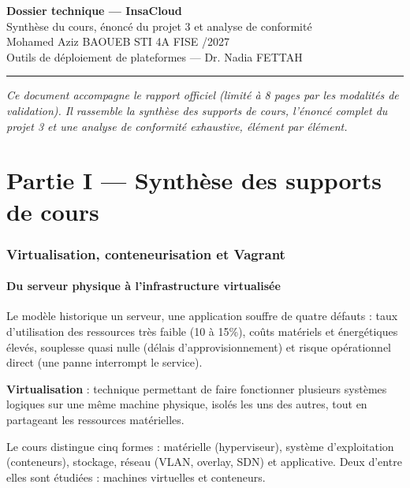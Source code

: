 \documentclass[11pt,a4paper]{article}
\begin{document}
\begin{center}
{\LARGE\bfseries Dossier technique --- InsaCloud}\\[3pt]
{\large Synthèse du cours, énoncé du projet 3 et analyse de conformité}\\[6pt]
{\small Mohamed Aziz BAOUEB \quad\textbullet\quad STI 4A FISE \quad\textbullet{}/2027\\
Outils de déploiement de plateformes --- Dr. Nadia FETTAH}
\end{center}
\rule{\linewidth}{0.8pt}

\small
\textit{Ce document accompagne le rapport officiel (limité à 8 pages par les modalités de validation).
Il rassemble la synthèse des supports de cours, l'énoncé complet du projet 3 et une analyse de
conformité exhaustive, élément par élément.}
\normalsize

\tableofcontents
\clearpage

\part*{Partie I --- Synthèse des supports de cours}

\section{Virtualisation, conteneurisation et Vagrant}

\subsection{Du serveur physique à l'infrastructure virtualisée}
Le modèle historique \og{}un serveur, une application\fg{} souffre de quatre défauts : taux d'utilisation
des ressources très faible (10 à 15\%), coûts matériels et énergétiques élevés, souplesse quasi nulle
(délais d'approvisionnement) et risque opérationnel direct (une panne interrompt le service).

\textbf{Virtualisation} : technique permettant de faire fonctionner plusieurs systèmes logiques sur une
même machine physique, isolés les uns des autres, tout en partageant les ressources matérielles.

Le cours distingue cinq formes : matérielle (hyperviseur), système d'exploitation (conteneurs),
stockage, réseau (VLAN, overlay, SDN) et applicative. Deux d'entre elles sont étudiées : machines
virtuelles et conteneurs.
\end{document}
